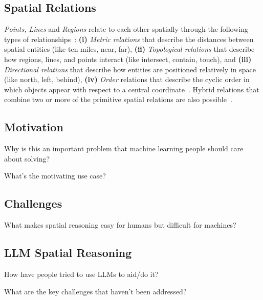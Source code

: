 \subsection{Spatial Relations}
\textit{Points, Lines} and \textit{Regions} relate to each other spatially through the following types of relationships~\cite{Carniel2020,Bertella2022,Carniel2023}: 
\textbf{(i)} \textit{Metric relations} that describe the distances between spatial entities (like ten miles, near, far), 
\textbf{(ii)} \textit{Topological relations} that describe how regions, lines, and points interact (like intersect, contain, touch), and 
\textbf{(iii)} \textit{Directional relations} that describe how entities are positioned relatively in space (like north, left, behind),
\textbf{(iv)} \textit{Order} relations that describe the cyclic order in which objects appear with respect to a central coordinate~\cite{Schwering2014}.
%
Hybrid relations that combine two or more of the primitive spatial relations are also possible~\cite{Carniel2023}.



\subsection{Motivation}
Why is this an important problem that machine learning people should care about solving?

What's the motivating use case?



\subsection{Challenges}
What makes spatial reasoning easy for humans but difficult for machines?


\subsection{LLM Spatial Reasoning}
How have people tried to use LLMs to aid/do it?

What are the key challenges that haven't been addressed?
